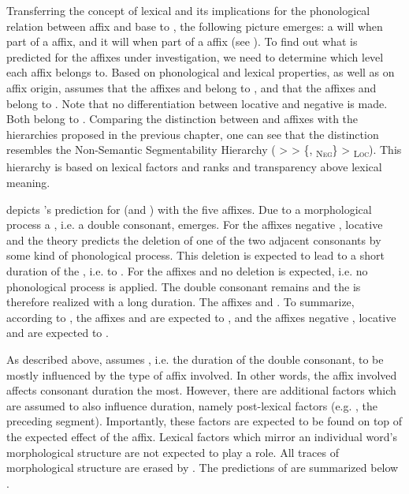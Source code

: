 Transferring the concept of lexical  and its implications for the phonological relation between affix and base to , the following picture emerges: a  will  when part of a  affix, and it will  when part of a  affix (see \citealt[18]{Mohanan.1986}). To find out what is predicted for the affixes under investigation, we need to determine which level each affix belongs to. 
Based on phonological and lexical properties, as well as on affix origin,  assumes that the affixes  and  belong to , and that the affixes  and  belong to . Note that no differentiation between locative and negative  is made. Both belong to .
Comparing the distinction between  and  affixes with the  hierarchies proposed in the previous chapter, one can see that the distinction resembles the Non-Semantic Segmentability Hierarchy ( >  > \{, \textsubscript{\textsc{Neg}}\} >  \textsubscript{\textsc{Loc}}). This hierarchy is based on lexical factors and ranks  and transparency above lexical meaning.  


 depicts 's prediction for  (and ) with the five affixes. Due to a morphological process a , i.e. a double consonant, emerges. For the  affixes negative , locative  and  the theory predicts the deletion of one of the two adjacent consonants by some kind of phonological process. This deletion is expected to lead to a short duration of the , i.e. to . For the affixes  and  no deletion is expected, i.e. no phonological process is applied. The double consonant remains and the  is therefore realized with a long duration. The affixes  and  .  
To summarize, according to , the  affixes  and  are expected to , and the  affixes negative , locative  and  are expected to . 

As described above,  assumes , i.e. the duration of the double consonant, to be mostly influenced by the type of affix involved. In other words, the affix involved affects consonant duration the most. However, there are additional factors which are assumed to also influence duration, namely post-lexical factors (e.g. , the preceding segment). Importantly, these factors are expected to be found on top of the expected effect of the affix. Lexical factors which mirror an individual word's morphological structure are not expected to play a role. All traces of morphological structure are erased by . 
The predictions of  are summarized below .



